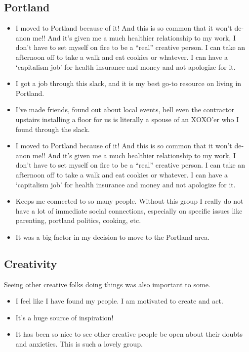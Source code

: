 \documentclass[
]{book}
\providecommand{\tightlist}{%
  \setlength{\itemsep}{0pt}\setlength{\parskip}{0pt}}
\begin{document}
\subsection{Portland}\label{portland-1}

\begin{itemize}
\tightlist
\item
  I moved to Portland because of it! And this is so common that it won't de-anon me!! And it's given me a much healthier relationship to my work, I don't have to set myself on fire to be a ``real'' creative person. I can take an afternoon off to take a walk and eat cookies or whatever. I can have a `capitalism job' for health insurance and money and not apologize for it.
\item
  I got a job through this slack, and it is my best go-to resource on living in Portland.
\item
  I've made friends, found out about local events, hell even the contractor upstairs installing a floor for us is literally a spouse of an XOXO'er who I found through the slack.
\item
  I moved to Portland because of it! And this is so common that it won't de-anon me!! And it's given me a much healthier relationship to my work, I don't have to set myself on fire to be a ``real'' creative person. I can take an afternoon off to take a walk and eat cookies or whatever. I can have a `capitalism job' for health insurance and money and not apologize for it.
\item
  Keeps me connected to so many people. Without this group I really do not have a lot of immediate social connections, especially on specific issues like parenting, portland politics, cooking, etc.
\item
  It was a big factor in my decision to move to the Portland area.
\end{itemize}

\subsection{Creativity}\label{creativity}

Seeing other creative folks doing things was also important to some.

\begin{itemize}
\tightlist
\item
  I feel like I have found my people. I am motivated to create and act.
\item
  It's a huge source of inspiration!
\item
  It has been so nice to see other creative people be open about their doubts and anxieties. This is such a lovely group.
\end{itemize}
\end{document}
